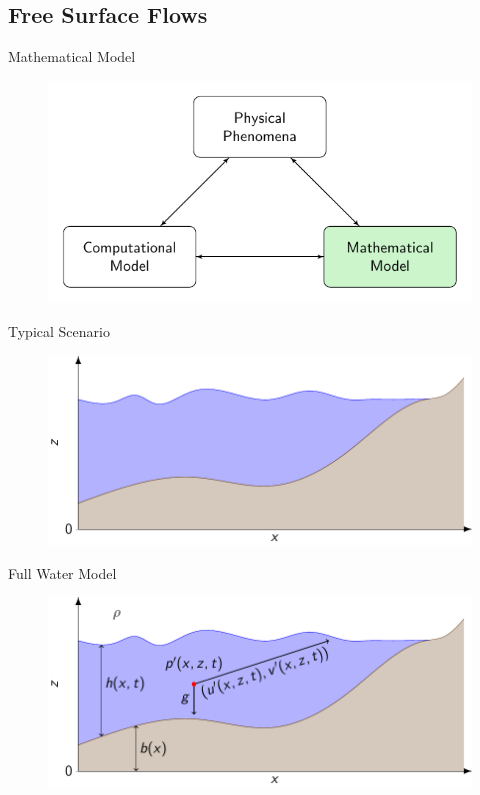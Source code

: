 \documentclass[handout]{beamer}
\begin{document}
\subsection{Free Surface Flows}
\begin{frame}{Mathematical Model}
	\begin{figure}
		\includegraphics[width=\textwidth]{./Pics/ModelDiagrams/FlowChartHigh2G.pdf}
	\end{figure}
\end{frame}
\begin{frame}{Typical Scenario}
	\begin{figure}
		\includegraphics[width=\textwidth]{./Pics/WaterModelDiagrams/FressSurface.pdf}
	\end{figure}
\end{frame}
\begin{frame}{Full Water Model}
	\begin{figure}
		\includegraphics[width=\textwidth]{./Pics/WaterModelDiagrams/NavierStokes.pdf}
	\end{figure}
\end{frame}
\end{document}
